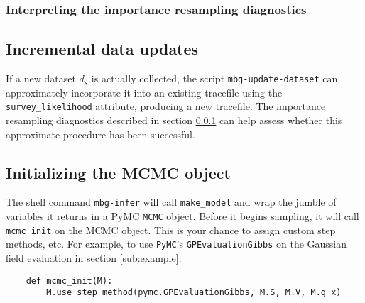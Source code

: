 \subsubsection{Interpreting the importance resampling diagnostics}
\label{subsub:importance} 

\subsection{Incremental data updates}
If a new dataset $d_s$ is actually collected, the script \texttt{mbg-update-dataset} can approximately incorporate it into an existing tracefile using the \texttt{survey\_likelihood} attribute, producing a new tracefile. The importance resampling diagnostics described in section \ref{subsub:importance} can help assess whether this approximate procedure has been successful. 

\subsection{Initializing the MCMC object}
\label{sub:mcmc-init} 

The shell command \texttt{mbg-infer} will call \texttt{make\_model} and wrap the jumble of variables it returns in a PyMC \texttt{MCMC} object. Before it begins sampling, it will call \texttt{mcmc\_init} on the MCMC object. This is your chance to assign custom step methods, etc. For example, to use \texttt{PyMC}'s \texttt{GPEvaluationGibbs} on the Gaussian field evaluation in section \ref{sub:example}:
\begin{verbatim}
    def mcmc_init(M):
        M.use_step_method(pymc.GPEvaluationGibbs, M.S, M.V, M.g_x)
\end{verbatim}



